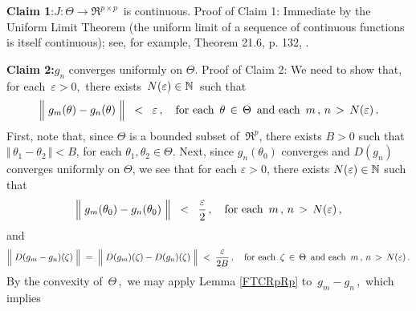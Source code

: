 \vskip 0.5cm
\noindent
\textbf{Claim 1}:\quad $J : \Theta \longrightarrow \Re^{p \times p}$\, is continuous.
\vskip 0.1cm
\noindent
Proof of Claim 1:\quad
Immediate by the Uniform Limit Theorem (the uniform limit of a sequence of continuous functions is itself continuous);
see, for example, Theorem 21.6, p. 132, \cite{Munkres2000}.

\vskip 0.5cm
\noindent
\textbf{Claim 2:}\quad $g_{n}$ converges uniformly on $\Theta$.
\vskip 0.1cm
\noindent
Proof of Claim 2:\quad
We need to show that, for each \,$\varepsilon > 0$,\, there exists \,$N(\varepsilon) \in \mathbb{N}$\, such that
\begin{equation*}
\left\Vert\;g_{m}(\theta) \overset{{\color{white}.}}{-} g_{n}(\theta)\;\right\Vert \;\; < \;\; \varepsilon\,,
\quad
\textnormal{for each \,$\theta \,\in\, \Theta$\, and each \,$m\,,\,n \,>\, N(\varepsilon)$}\,.
\end{equation*}
First, note that, since $\Theta$ is a bounded subset of \,$\Re^{p}$, there exists $B > 0$ such that
$\Vert\,\theta_{1} - \theta_{2}\,\Vert < B$, for each $\theta_{1}, \theta_{2}\in\Theta$.
Next, since $g_{n}(\theta_{0})$ converges and $D(g_{n})$ converges uniformly on $\Theta$,
we see that for each $\varepsilon > 0$, there exists $N(\varepsilon) \in \mathbb{N}$ such that
\begin{equation*}
\left\Vert\;g_{m}(\theta_{0}) \overset{{\color{white}.}}{-} g_{n}(\theta_{0})\;\right\Vert \;\; < \;\; \dfrac{\varepsilon}{2}\,,
\quad
\textnormal{for each \,$m\,,\,n \,>\, N(\varepsilon)$}\,,
\end{equation*}
and
\begin{equation*}
\left\Vert\; D(g_{m} \overset{{\color{white}.}}{-} g_{n})(\zeta) \;\right\Vert
\; = \;
	\left\Vert\;D(g_{m})(\zeta) \overset{{\color{white}.}}{-} D(g_{n})(\zeta)\;\right\Vert
\; < \;
	\dfrac{\varepsilon}{2 B}\,,
\quad
\textnormal{for each \,$\zeta \,\in\, \Theta$\, and each \,$m\,,\,n \,>\, N(\varepsilon)$}\,.
\end{equation*}
By the convexity of \,$\Theta$\,,\, we may apply Lemma \ref{FTCRpRp} to \,$g_{m} - g_{n}$\,,\,
which implies
